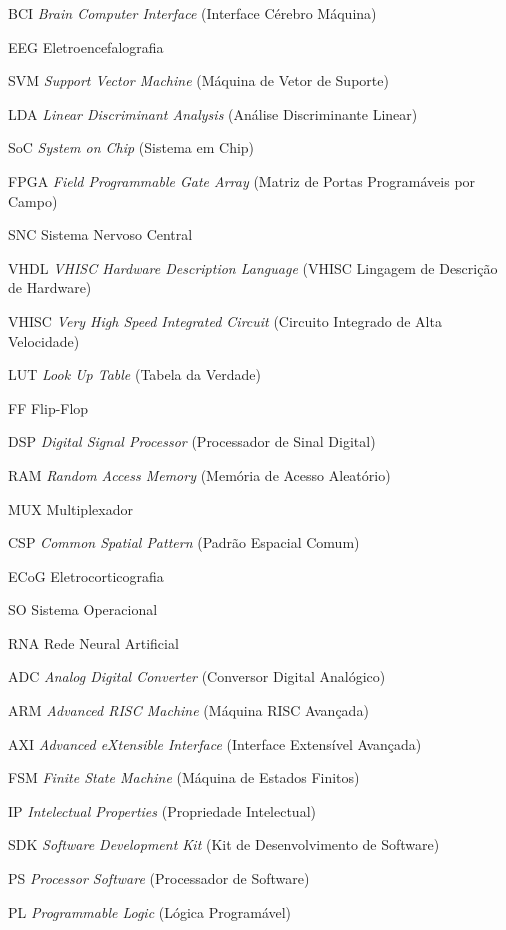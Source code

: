 \begin{siglas}
  \item[BCI] \textit{Brain Computer Interface} (Interface Cérebro Máquina)
  \item[EEG] Eletroencefalografia
  \item[SVM] \textit{Support Vector Machine} (Máquina de Vetor de Suporte)
  \item[LDA] \textit{Linear Discriminant Analysis} (Análise Discriminante Linear)
  \item[SoC] \textit{System on Chip} (Sistema em Chip)
  \item[FPGA] \textit{Field Programmable Gate Array} (Matriz de Portas Programáveis por Campo) 
  \item[SNC] Sistema Nervoso Central
  \item[VHDL] \textit{VHISC Hardware Description Language} (VHISC Lingagem de Descrição de Hardware)
  \item[VHISC] \textit{Very High Speed Integrated Circuit} (Circuito Integrado de Alta Velocidade)
  \item[LUT] \textit{Look Up Table} (Tabela da Verdade)
  \item[FF] Flip-Flop
  \item[DSP] \textit{Digital Signal Processor} (Processador de Sinal Digital)
  \item[RAM] \textit{Random Access Memory} (Memória de Acesso Aleatório)
  \item[MUX] Multiplexador
  \item[CSP] \textit{Common Spatial Pattern} (Padrão Espacial Comum)
  \item[ECoG] Eletrocorticografia
  \item[SO] Sistema Operacional
  \item[RNA] Rede Neural Artificial
  \item[ADC] \textit{Analog Digital Converter} (Conversor Digital Analógico)
  \item[ARM] \textit{Advanced RISC Machine} (Máquina RISC Avançada)
  \item[AXI] \textit{Advanced eXtensible Interface} (Interface Extensível Avançada)
  \item[FSM] \textit{Finite State Machine} (Máquina de Estados Finitos)
  \item[IP] \textit{Intelectual Properties} (Propriedade Intelectual)
  \item[SDK] \textit{Software Development Kit} (Kit de Desenvolvimento de Software)
  \item[PS] \textit{Processor Software} (Processador de Software)
  \item[PL] \textit{Programmable Logic} (Lógica Programável)
  
  
\end{siglas}
